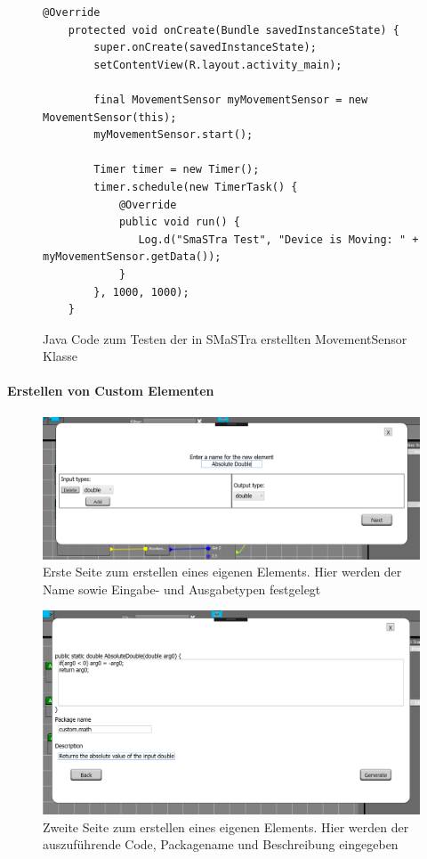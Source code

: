 \begin{figure}[h!]
\begin{lstlisting}
@Override
    protected void onCreate(Bundle savedInstanceState) {
        super.onCreate(savedInstanceState);
        setContentView(R.layout.activity_main);

        final MovementSensor myMovementSensor = new MovementSensor(this);
        myMovementSensor.start();

        Timer timer = new Timer();
        timer.schedule(new TimerTask() {
            @Override
            public void run() {
               Log.d("SmaSTra Test", "Device is Moving: " + myMovementSensor.getData());
            }
        }, 1000, 1000);
    }
\end{lstlisting}
\caption{Java Code zum Testen der in SMaSTra erstellten MovementSensor Klasse}%
\label{fig:firstcodeTest}
\end{figure}

\paragraph{Erstellen von Custom Elementen}
\begin{figure}[h!]
	\centering
		\includegraphics[width = \textwidth]{Manual/11_custom_name}
	\caption{Erste Seite zum erstellen eines eigenen Elements. Hier werden der Name sowie Eingabe- und Ausgabetypen festgelegt}
	\label{fig:11_custom_name}
\end{figure}

\begin{figure}[h!]
	\centering
		\includegraphics[width = \textwidth]{Manual/12_custom_code}
	\caption{Zweite Seite zum erstellen eines eigenen Elements. Hier werden der auszuf\"uhrende Code, Packagename und Beschreibung eingegeben }
	\label{fig:12_custom_code}
\end{figure}

